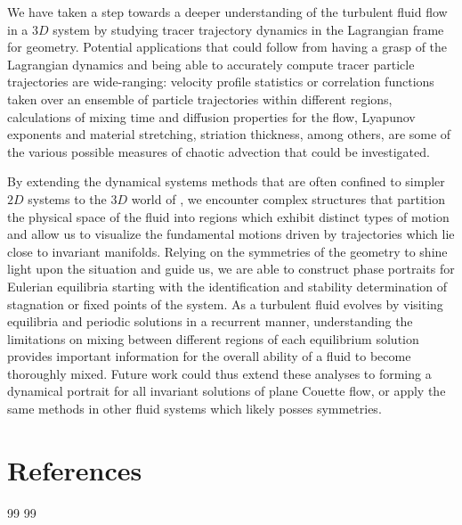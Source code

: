 \documentclass[lineno]{jfm}
\begin{document}
We have taken a step towards a deeper understanding of the  turbulent 
fluid flow in a $3D$ system  by studying 
tracer trajectory dynamics in the Lagrangian frame for {\pC} geometry. Potential 
applications that could follow from having a grasp of the Lagrangian 
dynamics and being able to accurately compute tracer particle 
trajectories are wide-ranging: velocity profile statistics or correlation 
functions taken over an ensemble of particle trajectories within 
different regions, calculations of mixing time and diffusion properties 
for the flow, Lyapunov exponents and material stretching, striation 
thickness, among others, are some of the various possible measures of 
chaotic advection that could be investigated.  

By extending the dynamical 
systems methods that are often confined to simpler $2D$ systems to the 
$3D$ world of {\pCf}, we encounter complex structures that 
partition the physical space of the fluid into regions which exhibit 
distinct types of motion and allow us to visualize the fundamental 
motions driven by trajectories which lie close to invariant manifolds. 
Relying on the symmetries of the geometry to shine light upon the 
situation and guide us, we are able to construct phase portraits for 
{\pC} Eulerian equilibria starting with the identification and stability 
determination of stagnation or fixed points of the system. As a turbulent fluid evolves by visiting equilibria and periodic solutions in a recurrent manner, understanding the limitations on mixing between different regions of each equilibrium solution provides important information for the overall ability of a fluid to become thoroughly mixed.  Future work could thus extend these analyses to forming a dynamical portrait for all invariant solutions of plane
 Couette flow, or apply the same methods in other fluid systems which likely posses symmetries.

\fi %

    \ifsubmission
\section*{References}
{99} %
    \else
{99} %
    \fi
\end{document}
